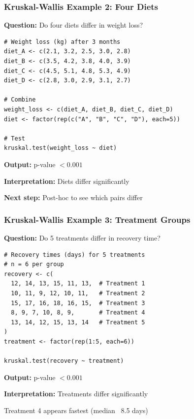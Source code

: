 \documentclass{beamer}
\begin{document}
\begin{frame}[fragile]
\frametitle{Kruskal-Wallis Example 2: Four Diets}
\textbf{Question:} Do four diets differ in weight loss?

\vspace{0.3cm}
\begin{small}
\begin{verbatim}
# Weight loss (kg) after 3 months
diet_A <- c(2.1, 3.2, 2.5, 3.0, 2.8)
diet_B <- c(3.5, 4.2, 3.8, 4.0, 3.9)
diet_C <- c(4.5, 5.1, 4.8, 5.3, 4.9)
diet_D <- c(2.8, 3.0, 2.9, 3.1, 2.7)

# Combine
weight_loss <- c(diet_A, diet_B, diet_C, diet_D)
diet <- factor(rep(c("A", "B", "C", "D"), each=5))

# Test
kruskal.test(weight_loss ~ diet)
\end{verbatim}
\end{small}

\textbf{Output:} p-value $< 0.001$

\textbf{Interpretation:} Diets differ significantly

\textbf{Next step:} Post-hoc to see which pairs differ
\end{frame}

\begin{frame}[fragile]
\frametitle{Kruskal-Wallis Example 3: Treatment Groups}
\textbf{Question:} Do 5 treatments differ in recovery time?

\vspace{0.3cm}
\begin{small}
\begin{verbatim}
# Recovery times (days) for 5 treatments
# n = 6 per group
recovery <- c(
  12, 14, 13, 15, 11, 13,  # Treatment 1
  10, 11, 9, 12, 10, 11,   # Treatment 2
  15, 17, 16, 18, 16, 15,  # Treatment 3
  8, 9, 7, 10, 8, 9,       # Treatment 4
  13, 14, 12, 15, 13, 14   # Treatment 5
)
treatment <- factor(rep(1:5, each=6))

kruskal.test(recovery ~ treatment)
\end{verbatim}
\end{small}

\textbf{Output:} p-value $< 0.001$

\textbf{Interpretation:} Treatments differ significantly

Treatment 4 appears fastest (median ~8.5 days)
\end{frame}
\end{document}
